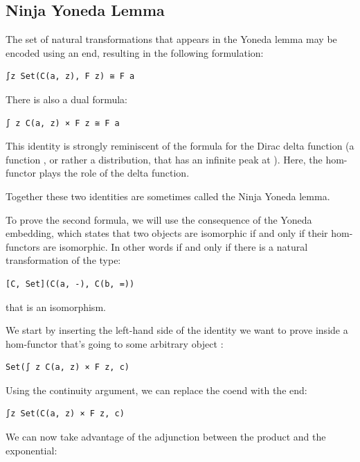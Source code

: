\subsection{Ninja Yoneda Lemma}\label{ninja-yoneda-lemma}

The set of natural transformations that appears in the Yoneda lemma may
be encoded using an end, resulting in the following formulation:

\begin{verbatim}
∫z Set(C(a, z), F z) ≅ F a
\end{verbatim}

There is also a dual formula:

\begin{verbatim}
∫ z C(a, z) × F z ≅ F a
\end{verbatim}

This identity is strongly reminiscent of the formula for the Dirac delta
function (a function , or rather a distribution, that
has an infinite peak at ). Here, the hom-functor plays
the role of the delta function.

Together these two identities are sometimes called the Ninja Yoneda
lemma.

To prove the second formula, we will use the consequence of the Yoneda
embedding, which states that two objects are isomorphic if and only if
their hom-functors are isomorphic. In other words  if
and only if there is a natural transformation of the type:

\begin{verbatim}
[C, Set](C(a, -), C(b, =))
\end{verbatim}

that is an isomorphism.

We start by inserting the left-hand side of the identity we want to
prove inside a hom-functor that's going to some arbitrary object
:

\begin{verbatim}
Set(∫ z C(a, z) × F z, c)
\end{verbatim}

Using the continuity argument, we can replace the coend with the end:

\begin{verbatim}
∫z Set(C(a, z) × F z, c)
\end{verbatim}

We can now take advantage of the adjunction between the product and the
exponential:

